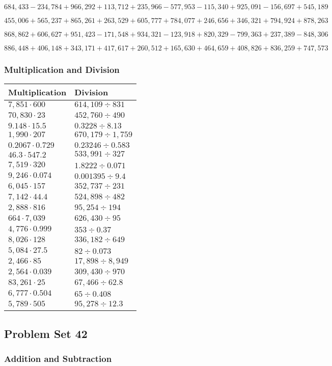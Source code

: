 \(684,433-234,784+966,292+113,712+235,966-577,953-115,340+925,091-156,697+545,189\)

\(455,006+565,237+865,261+263,529+605,777+784,077+246,656+346,321+794,924+878,263\)

\(868,862+606,627+951,423-171,548+934,321-123,918+820,329-799,363+237,389-848,306\)

\(886,448+406,148+343,171+417,617+260,512+165,630+464,659+408,826+836,259+747,573\)

\hypertarget{multiplication-and-division-345}{%
\subsubsection{Multiplication and
Division}\label{multiplication-and-division-345}}

\begin{longtable}[]{@{}ll@{}}
\toprule
Multiplication & Division\tabularnewline
\midrule
\endhead
\(7,851\cdot600\) & \(614,109÷831\)\tabularnewline
\(70,830\cdot23\) & \(452,760÷490\)\tabularnewline
\(9.148\cdot15.5\) & \(0.3228÷8.13\)\tabularnewline
\(1,990\cdot207\) & \(670,179÷1,759\)\tabularnewline
\(0.2067\cdot0.729\) & \(0.23246÷0.583\)\tabularnewline
\(46.3\cdot547.2\) & \(533,991÷327\)\tabularnewline
\(7,519\cdot320\) & \(1.8222÷0.071\)\tabularnewline
\(9,246\cdot0.074\) & \(0.001395÷9.4\)\tabularnewline
\(6,045\cdot157\) & \(352,737÷231\)\tabularnewline
\(7,142\cdot44.4\) & \(524,898÷482\)\tabularnewline
\(2,888\cdot816\) & \(95,254÷194\)\tabularnewline
\(664\cdot7,039\) & \(626,430÷95\)\tabularnewline
\(4,776\cdot0.999\) & \(353÷0.37\)\tabularnewline
\(8,026\cdot128\) & \(336,182÷649\)\tabularnewline
\(5,084\cdot27.5\) & \(82÷0.073\)\tabularnewline
\(2,466\cdot85\) & \(17,898÷8,949\)\tabularnewline
\(2,564\cdot0.039\) & \(309,430÷970\)\tabularnewline
\(83,261\cdot25\) & \(67,466÷62.8\)\tabularnewline
\(6,777\cdot0.504\) & \(65÷0.408\)\tabularnewline
\(5,789\cdot505\) & \(95,278÷12.3\)\tabularnewline
\bottomrule
\end{longtable}

\hypertarget{problem-set-42-4}{%
\subsection{Problem Set 42}\label{problem-set-42-4}}

\hypertarget{addition-and-subtraction-347}{%
\subsubsection{Addition and
Subtraction}\label{addition-and-subtraction-347}}

